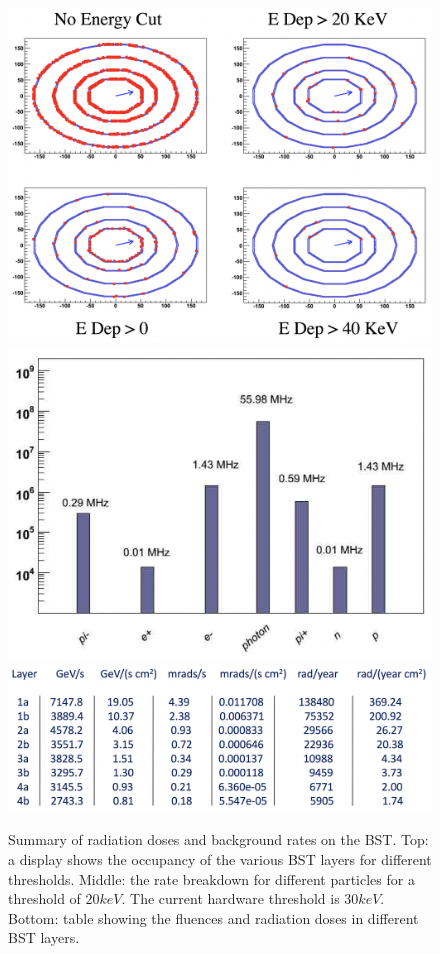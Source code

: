 \begin{figure}
	\centering
	\includegraphics[width=0.95\columnwidth,keepaspectratio]{img/bstHitDisplay.png}
	\includegraphics[width=0.95\columnwidth,keepaspectratio]{img/bstRates.png}
	\includegraphics[width=0.95\columnwidth,keepaspectratio]{img/bstRadSummary.png}
	\caption{Summary of radiation doses and background rates on the BST. Top: a display shows the occupancy of the various BST layers
            for different thresholds. Middle: the rate breakdown for different particles for a threshold of $20 keV$.
            The current hardware threshold is $30 keV$. Bottom: table showing the fluences and radiation doses in different BST
            layers. }
	\label{fig:radStudy}
\end{figure}




